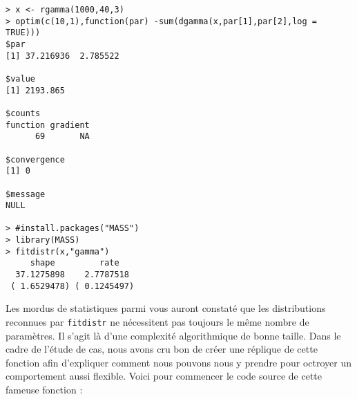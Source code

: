 \begin{lstlisting}[caption = Ajustement de distribution sur données empiriques,label=src:fitdistr]
> x <- rgamma(1000,40,3)
> optim(c(10,1),function(par) -sum(dgamma(x,par[1],par[2],log = TRUE)))
$par
[1] 37.216936  2.785522

$value
[1] 2193.865

$counts
function gradient
      69       NA

$convergence
[1] 0

$message
NULL

> #install.packages("MASS")
> library(MASS)
> fitdistr(x,"gamma")
     shape         rate
  37.1275898    2.7787518
 ( 1.6529478) ( 0.1245497)
\end{lstlisting}

Les mordus de statistiques parmi vous auront constaté que les distributions reconnues par \texttt{fitdistr} ne nécessitent pas toujours le même nombre de paramètres. Il s'agit là d'une complexité algorithmique de bonne taille. Dans le cadre de l'étude de cas, nous avons cru bon de créer une réplique de cette fonction afin d'expliquer comment nous pouvons nous y prendre pour octroyer un comportement aussi flexible. Voici pour commencer le code source de cette fameuse fonction : \\

